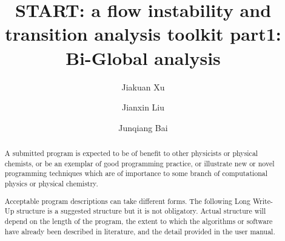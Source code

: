 \documentclass[preprint,12pt]{elsarticle}
\begin{document}
\begin{frontmatter}



\title{START: a flow instability and transition analysis toolkit part1: Bi-Global analysis}


\author[a,b]{Jiakuan Xu}
\author[c]{Jianxin Liu}
\author[d]{Junqiang Bai}

\address[a]{Center for Applied Mathematics, Tianjin University, Tianjin 300072, P.R.China}
\address[b]{Imperial College London, London, SW7 2AZ, United Kingdom}
\address[c]{Laboratory for High-speed Aerodynamics, School of Mechanical Engineering, Tianjin
University, Tianjin 300072, P.R.China}
\address[d]{School of Aeronautics, Northwestern Polytechnical University, Xi’an 710072, P.R.China}

\begin{abstract}
A submitted program is expected to be of benefit to other physicists or physical chemists, or be an exemplar of good programming practice, or illustrate new or novel programming techniques which are of importance to some branch of computational physics or physical chemistry.

Acceptable program descriptions can take different forms. The following Long Write-Up structure is a suggested structure but it is not obligatory. Actual structure will depend on the length of the program, the extent to which the algorithms or software have already been described in literature, and the detail provided in the user manual.


\end{abstract}
\end{frontmatter}
\end{document}
